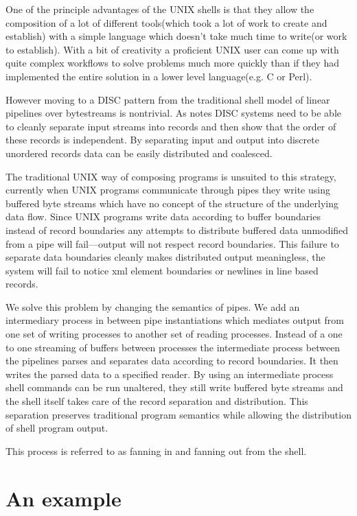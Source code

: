 \documentclass[11pt, letterpaper]{article}
\begin{document}
One of the principle advantages of the UNIX shells is that they allow the composition of a lot of different tools(which took a lot of work to create and establish) with a simple language which doesn't take much time to write(or work to establish). With a bit of creativity a proficient UNIX user can come up with quite complex workflows to solve problems much more quickly than if they had implemented the entire solution in a lower level language(e.g. C or Perl). 

However moving to a DISC pattern from the traditional shell model of linear pipelines over bytestreams is nontrivial. 
As \cite{pike2005idp} notes DISC systems need to be able to cleanly separate input streams into records and then show that the order of these records is independent. By separating input and output into discrete unordered records data can be easily distributed and coalesced.

The traditional UNIX way of composing programs is unsuited to this strategy, currently when UNIX programs communicate through pipes they write using buffered byte streams which have no concept of the structure of the underlying data flow. Since UNIX programs write data according to buffer boundaries instead of record boundaries any attempts to distribute buffered data unmodified from a pipe will fail---output will not respect record boundaries. This failure to separate data boundaries cleanly makes distributed output meaningless, the system will fail to notice xml element boundaries or newlines in line based records. 

We solve this problem by changing the semantics of pipes.  We add an intermediary process in between pipe instantiations which mediates output from one set of writing processes to another set of reading processes. Instead of a one to one streaming of buffers between processes the intermediate process between the pipelines parses and separates data according to record boundaries. It then writes the parsed data to a specified reader. By using an intermediate process shell commands can be run unaltered, they still write buffered byte streams and the shell itself takes care of the record separation and distribution. This separation preserves traditional program semantics while allowing the distribution of shell program output.

This process is referred to as fanning in and fanning out from the shell.    
\section{An example}
\end{document}
